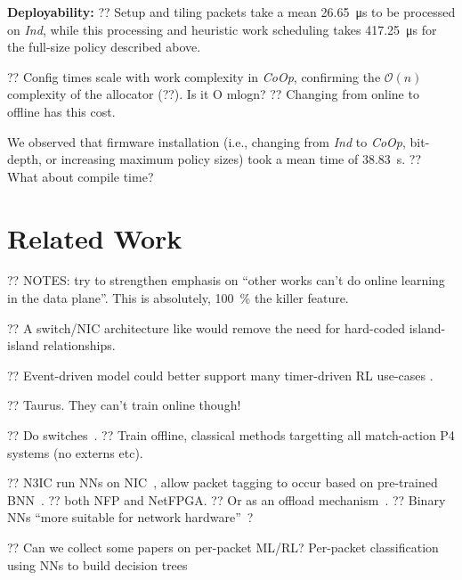\documentclass[sigconf,natbib=false]{acmart}
\newcommand{\fakepara}[1]{\noindent\textbf{#1:}}
\newcommand{\Coopfw}{\emph{CoOp}}
\newcommand{\Indfw}{\emph{Ind}}
\begin{document}
\fakepara{Deployability}
?? Setup and tiling packets take a mean \SI{26.65}{\micro\second} to be processed on \Indfw{}, while this processing and heuristic work scheduling takes \SI{417.25}{\micro\second} for the full-size policy described above.

?? Config times scale with work complexity in \Coopfw{}, confirming the $\mathcal{O}{\left(n\right)}$ complexity of the allocator (??). Is it O mlogn?
?? Changing from online to offline has this cost.

We observed that firmware installation (i.e., changing from \Indfw{} to \Coopfw{}, bit-depth, or increasing maximum policy sizes) took a mean time of \SI{38.83}{\second}.
?? What about compile time?

\section{Related Work}

?? NOTES: try to strengthen emphasis on ``other works can't do online learning in the data plane''. This is absolutely, \SI{100}{\percent} the killer feature.

?? A switch/NIC architecture like \textcite{DBLP:conf/hotnets/StephensAS18} would remove the need for hard-coded island-island relationships.

?? Event-driven model could better support many timer-driven RL use-cases \textcite{DBLP:conf/hotnets/IbanezABM19}.

?? Taurus. They can't train online though!~\parencite{DBLP:journals/corr/abs-2002-08987}

?? Do switches~\parencite{DBLP:conf/hotnets/XiongZ19}.
?? Train offline, classical methods targetting all match-action P4 systems (no externs etc).

\parencite{DBLP:journals/corr/abs-2002-08987,DBLP:journals/corr/abs-2009-02353,DBLP:conf/sigcomm/SanvitoSB18,DBLP:journals/corr/abs-1801-05731,langlet-ml-netronome}

?? N3IC run NNs on NIC~\parencite{DBLP:journals/corr/abs-2009-02353}, allow packet tagging to occur based on pre-trained BNN~\parencite{DBLP:conf/nips/HubaraCSEB16}.
?? both NFP and NetFPGA.
?? Or as an offload mechanism~\parencite{DBLP:conf/sigcomm/SanvitoSB18,DBLP:journals/corr/abs-1801-05731}.
?? Binary NNs ``more suitable for network hardware''~\parencite{DBLP:journals/corr/MiyashitaLM16}?

?? Can we collect some papers on per-packet ML/RL? Per-packet classification using NNs to build decision trees~\parencite{DBLP:conf/sigcomm/LiangZJS19}
\end{document}
